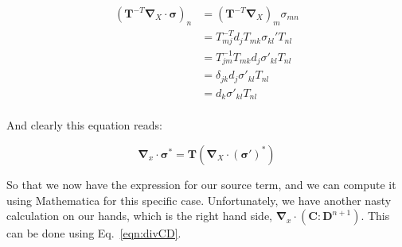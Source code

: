 \documentclass[11pt]{article}
\newcommand{\bsig}{\boldsymbol\sigma}
\newcommand{\bC}{\mathbf{C}}
\newcommand{\bD}{\mathbf{D}}
\newcommand{\bT}{\mathbf{T}}
\newcommand{\bU}{\mathbf{U}}
\newcommand{\bX}{\mathbf{X}}
\newcommand{\bx}{\mathbf{x}}
\newcommand{\bu}{\mathbf{u}}
\newcommand{\bgrad}{\boldsymbol{\nabla}}
\begin{document}
\begin{align*}
    \left(\bT^{-T}\bgrad_X\cdot\bsig\right)_n &= \left(\bT^{-T}\bgrad_X\right)_m\sigma_{mn}\\
    &= T^{-T}_{mj}d_jT_{mk}\sigma_{kl}'T_{nl}\\
    &= T^{-1}_{jm}T_{mk}d_j\sigma'_{kl}T_{nl}\\
    &= \delta_{jk}d_j\sigma'_{kl}T_{nl}\\
    &= d_k\sigma'_{kl}T_{nl}\\
\end{align*}

And clearly this equation reads:

\begin{equation}
    \bgrad_x\cdot\bsig^* = \bT (\bgrad_X \cdot ( \bsig' )^*)
    \label{eqn:qs_source_gen_trans}
\end{equation}

So that we now have the expression for our source term, and we can compute it using Mathematica for this specific case. Unfortunately, we have another nasty calculation on our hands, which is the right hand side, $\bgrad_x \cdot (\bC : \bD^{n+1})$. This can be done using Eq.~\ref{eqn:divCD}.





\end{document}
